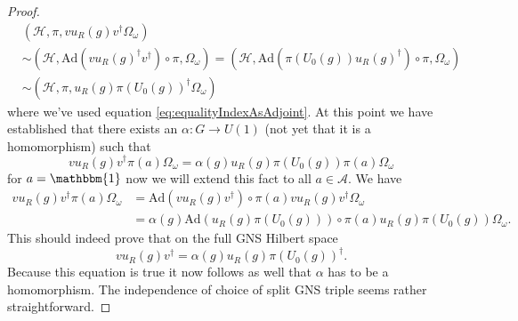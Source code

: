 \documentclass[12pt,a4paper,twoside]{article}
\newcommand{\HH}{\mathcal H}
\renewcommand{\AA}{\mathcal A}
\newcommand{\one}{\mathbbm{1}}
\newcommand{\Ad}{\textrm{Ad}}
\theoremstyle{definition}
\newtheorem{lemma}[theorem]{Lemma}
\numberwithin{equation}{section}
\begin{document}
\begin{proof}
\begin{align}
	 	&(\HH,\pi,v u_R(g)v^\dagger \Omega_\omega)\\
	 	&\sim (\HH,\Ad(v u_R(g)^\dagger v^\dagger)\circ\pi,\Omega_\omega)=(\HH,\Ad(\pi(U_0(g))u_R(g)^\dagger)\circ\pi,\Omega_\omega)\\
	 	&\sim (\HH,\pi,u_R(g)\pi(U_0(g))^\dagger \Omega_\omega)
	 \end{align}
 	where we've used equation \eqref{eq:equalityIndexAsAdjoint}. At this point we have established that there exists an $\alpha:G\rightarrow U(1)$ (not yet that it is a homomorphism) such that
 	\begin{equation}
 		v u_R(g) v^\dagger \pi(a) \Omega_\omega =\alpha(g) u_R(g) \pi(U_0(g))\pi(a) \Omega_\omega
 	\end{equation}
 	for $a=\one$ now we will extend this fact to all $a\in\AA$. We have
 	\begin{align}
 		v u_R(g) v^\dagger \pi(a) \Omega_\omega&=\Ad(v u_R(g) v^\dagger)\circ \pi(a) v u_R(g) v^\dagger \Omega_\omega\\
 		&=\alpha(g) \Ad(u_R(g) \pi(U_0(g)))\circ \pi(a) u_R(g) \pi(U_0(g)) \Omega_\omega.
 	\end{align}
 	This should indeed prove that on the full GNS Hilbert space
 	\begin{equation}
 		v u_R(g)v^\dagger =\alpha(g) u_R(g)\pi(U_0(g))^\dagger.
 	\end{equation}
 	Because this equation is true it now follows as well that $\alpha$ has to be a homomorphism. The independence of choice of split GNS triple seems rather straightforward.
\end{proof}
{}

\end{document}
